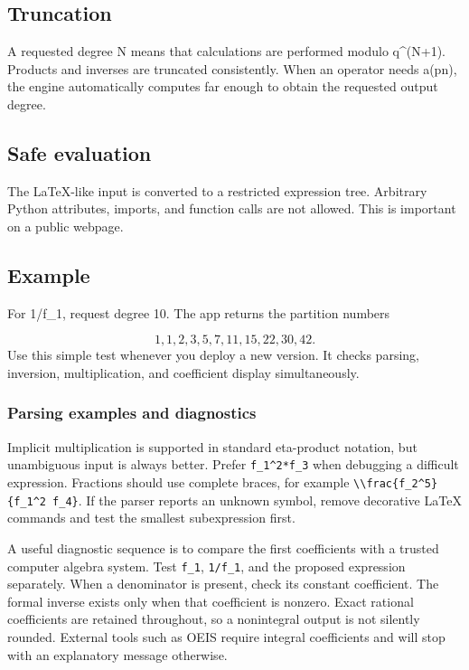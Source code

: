 \documentclass[11pt]{article}
\begin{document}
\subsection*{Truncation}
A requested degree N means that calculations are performed modulo q\textasciicircum{}(N+1). Products and inverses are truncated consistently. When an operator needs a(pn), the engine automatically computes far enough to obtain the requested output degree.

\subsection*{Safe evaluation}
The LaTeX-like input is converted to a restricted expression tree. Arbitrary Python attributes, imports, and function calls are not allowed. This is important on a public webpage.

\subsection*{Example}
For 1/f\_1, request degree 10. The app returns the partition numbers

\[
1,1,2,3,5,7,11,15,22,30,42.
\]
Use this simple test whenever you deploy a new version. It checks parsing, inversion, multiplication, and coefficient display simultaneously.

\subsubsection*{Parsing examples and diagnostics}
Implicit multiplication is supported in standard eta-product notation, but unambiguous input is always better. Prefer \texttt{f\_1\textasciicircum{}2*f\_3} when debugging a difficult expression. Fractions should use complete braces, for example \texttt{\textbackslash{}\textbackslash{}frac\{f\_2\textasciicircum{}5\}\{f\_1\textasciicircum{}2 f\_4\}}. If the parser reports an unknown symbol, remove decorative LaTeX commands and test the smallest subexpression first.

A useful diagnostic sequence is to compare the first coefficients with a trusted computer algebra system. Test \texttt{f\_1}, \texttt{1/f\_1}, and the proposed expression separately. When a denominator is present, check its constant coefficient. The formal inverse exists only when that coefficient is nonzero. Exact rational coefficients are retained throughout, so a nonintegral output is not silently rounded. External tools such as OEIS require integral coefficients and will stop with an explanatory message otherwise.
\end{document}
